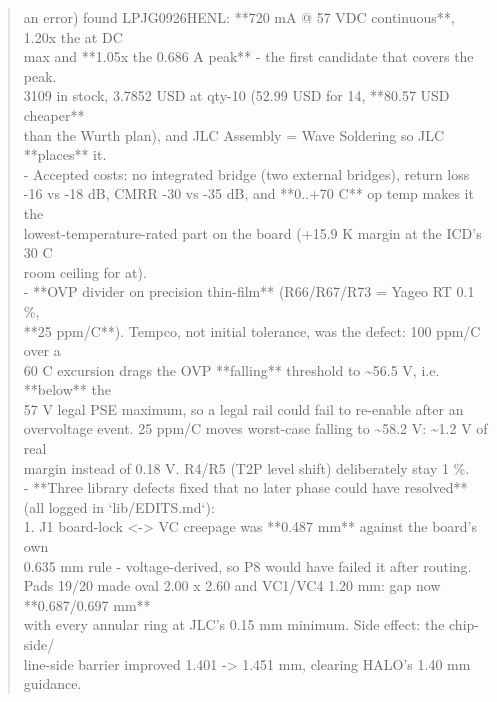 \documentclass[11pt,a4paper]{article}
\begin{document}
\begin{quote}
    an error) found LPJG0926HENL: {*}{*}720 mA @ 57 VDC continuous{*}{*}, 1.20x the at DC\\
    max and {*}{*}1.05x the 0.686 A peak{*}{*} - the first candidate that covers the peak.\\
    3109 in stock, 3.7852 USD at qty-10 (52.99 USD for 14, {*}{*}80.57 USD cheaper{*}{*}\\
    than the Wurth plan), and JLC Assembly = Wave Soldering so JLC {*}{*}places{*}{*} it.\\
  - Accepted costs: no integrated bridge (two external bridges), return loss\\
    -16 vs -18 dB, CMRR -30 vs -35 dB, and {*}{*}0..+70 C{*}{*} op temp makes it the\\
    lowest-temperature-rated part on the board (+15.9 K margin at the ICD's 30 C\\
    room ceiling for at).\\
- {*}{*}OVP divider on precision thin-film{*}{*} (R66/R67/R73 = Yageo RT 0.1 \%,\\
  {*}{*}25 ppm/C{*}{*}). Tempco, not initial tolerance, was the defect: 100 ppm/C over a\\
  60 C excursion drags the OVP {*}{*}falling{*}{*} threshold to \textasciitilde{}56.5 V, i.e. {*}{*}below{*}{*} the\\
  57 V legal PSE maximum, so a legal rail could fail to re-enable after an\\
  overvoltage event. 25 ppm/C moves worst-case falling to \textasciitilde{}58.2 V: \textasciitilde{}1.2 V of real\\
  margin instead of 0.18 V. R4/R5 (T2P level shift) deliberately stay 1 \%.\\
- {*}{*}Three library defects fixed that no later phase could have resolved{*}{*}\\
  (all logged in `lib/EDITS.md`):\\
  1. J1 board-lock \textless{}-\textgreater{} VC creepage was {*}{*}0.487 mm{*}{*} against the board's own\\
     0.635 mm rule - voltage-derived, so P8 would have failed it after routing.\\
     Pads 19/20 made oval 2.00 x 2.60 and VC1/VC4 1.20 mm: gap now {*}{*}0.687/0.697 mm{*}{*}\\
     with every annular ring at JLC's 0.15 mm minimum. Side effect: the chip-side/\\
     line-side barrier improved 1.401 -\textgreater{} 1.451 mm, clearing HALO's 1.40 mm guidance.\\

\end{quote}
\end{document}
